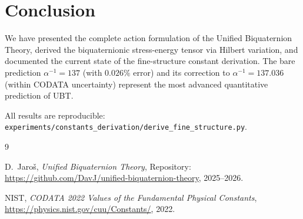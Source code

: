 \documentclass[12pt,a4paper]{article}
\begin{document}
\section{Conclusion}
\label{sec:conclusion}

We have presented the complete action formulation of the Unified Biquaternion
Theory, derived the biquaternionic stress-energy tensor via Hilbert variation,
and documented the current state of the fine-structure constant derivation.
The bare prediction $\alpha^{-1} = 137$ (with $0.026\%$ error) and its
correction to $\alpha^{-1} = 137.036$ (within CODATA uncertainty) represent
the most advanced quantitative prediction of UBT.

All results are reproducible:
\texttt{experiments/constants\_derivation/derive\_fine\_structure.py}.


\begin{thebibliography}{9}

D.~Jaroš,
\emph{Unified Biquaternion Theory},
Repository: \url{https://github.com/DavJ/unified-biquaternion-theory},
2025--2026.

NIST,
\emph{CODATA 2022 Values of the Fundamental Physical Constants},
\url{https://physics.nist.gov/cuu/Constants/}, 2022.

\end{thebibliography}
\end{document}
